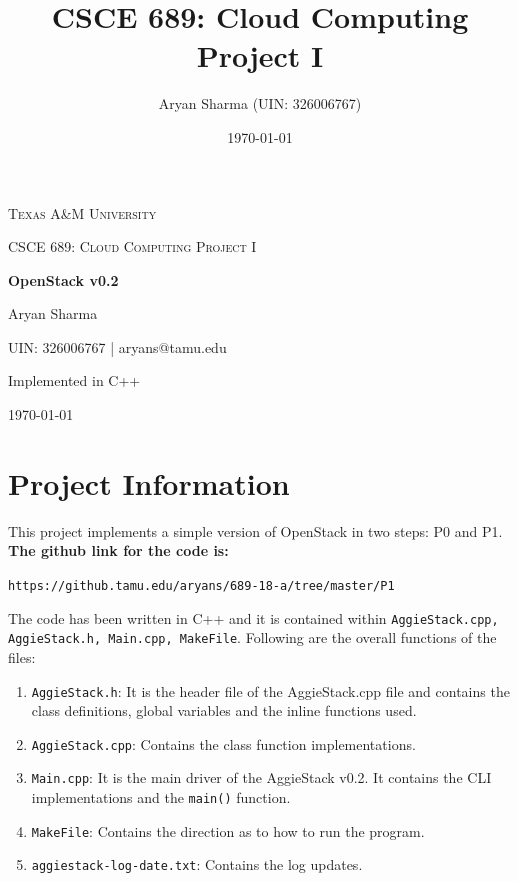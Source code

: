 \documentclass[letterpaper]{article}
\title{CSCE 689: Cloud Computing Project I}
\author{Aryan Sharma (UIN: 326006767)}
\date{\today}
\newcommand\blankpage{%
	\null
	\thispagestyle{empty}%
	\addtocounter{page}{-1}%
	\newpage}
\begin{document}


\begin{titlepage}
	\centering
	{\scshape\LARGE Texas A\&M University \par}
	\vspace{1cm}
	{\scshape\Large CSCE 689: Cloud Computing Project I\par}
	\vspace{1.5cm}
	{\huge\bfseries OpenStack v0.2\par}
	\vspace{2cm}
	{\Large Aryan Sharma \par}
	{\normalsize UIN: 326006767 | aryans@tamu.edu\par}
	\vfill
	Implemented in C++
	\vfill
	
	{\large \today\par}
\end{titlepage}

\tableofcontents

\newpage

\section{Project Information}
\label{sec:introduction}

This project implements a simple version of OpenStack in two steps: P0 and P1. \textbf{The github link for the code is: }

\vspace{1em}	
	\texttt{https://github.tamu.edu/aryans/689-18-a/tree/master/P1}
\vspace{1em}

The code has been written in C++ and it is contained within \texttt{AggieStack.cpp, AggieStack.h, Main.cpp, MakeFile}. Following are the overall functions of the files:

\begin{enumerate}
	\item \texttt{AggieStack.h}: It is the header file of the AggieStack.cpp file and contains the class definitions, global variables and the inline functions used.
	\item \texttt{AggieStack.cpp}: Contains the class function implementations.
	\item \texttt{Main.cpp}: It is the main driver of the AggieStack v0.2. It contains the CLI implementations and the \texttt{main()} function.
	\item \texttt{MakeFile}: Contains the direction as to how to run the program. 
	\item \texttt{aggiestack-log-date.txt}: Contains the log updates. 
\end{enumerate}
\end{document}
